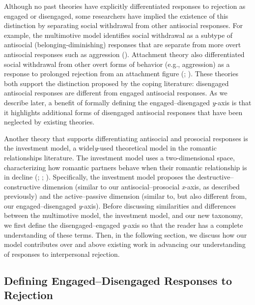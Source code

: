 \documentclass[
]{udthesis}
\begin{document}
Although no past theories have explicitly differentiated responses to
rejection as engaged or disengaged, some researchers have implied the
existence of this distinction by separating social withdrawal from other
antisocial responses. For example, the multimotive model identifies
social withdrawal as a subtype of antisocial (belonging-diminishing)
responses that are separate from more overt antisocial responses such as
aggression ().
Attachment theory also differentiated social withdrawal from other overt
forms of behavior (e.g., aggression) as a response to prolonged
rejection from an attachment figure (; ). These theories both support the
distinction proposed by the coping literature: disengaged antisocial
responses are different from engaged antisocial responses. As we
describe later, a benefit of formally defining the engaged--disengaged
\emph{y}-axis is that it highlights additional forms of disengaged antisocial
responses that have been neglected by existing theories.

Another theory that supports differentiating antisocial and prosocial
responses is the investment model, a widel\emph{y}-used theoretical model in
the romantic relationships literature. The investment model uses a
two-dimensional space, characterizing how romantic partners behave when
their romantic relationship is in decline (; ; ). Specifically, the investment
model proposes the destructive--constructive dimension (similar to our
antisocial--prosocial \emph{x}-axis, as described previously) and the
active--passive dimension (similar to, but also different from, our
engaged--disengaged \emph{y}-axis). Before discussing similarities and
differences between the multimotive model, the investment model, and our
new taxonomy, we first define the disengaged--engaged \emph{y}-axis so that
the reader has a complete understanding of these terms. Then, in the
following section, we discuss how our model contributes over and above
existing work in advancing our understanding of responses to
interpersonal rejection.

\subsection{Defining Engaged--Disengaged Responses to Rejection}\label{defining-engageddisengaged-responses-to-rejection}
\end{document}
